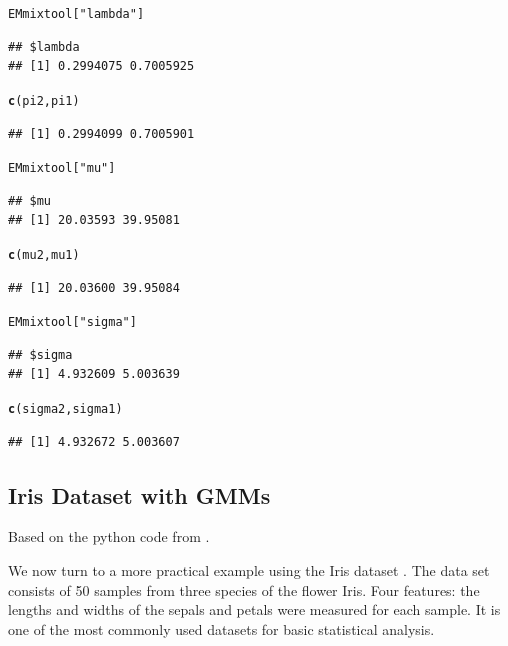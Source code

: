 \documentclass{article}\usepackage[]{graphicx}\usepackage[]{xcolor}
\makeatletter
\newcommand{\hlstr}[1]{\textcolor[rgb]{0.192,0.494,0.8}{#1}}%
\newcommand{\hlstd}[1]{\textcolor[rgb]{0.345,0.345,0.345}{#1}}%
\newcommand{\hlkwd}[1]{\textcolor[rgb]{0.737,0.353,0.396}{\textbf{#1}}}%
\newenvironment{kframe}{%
 \def\at@end@of@kframe{}%
 \ifinner\ifhmode%
  \def\at@end@of@kframe{\end{minipage}}%
  \begin{minipage}{\columnwidth}%
 \fi\fi%
 \def\FrameCommand##1{\hskip\@totalleftmargin \hskip-\fboxsep
 \colorbox{shadecolor}{##1}\hskip-\fboxsep
     \hskip-\linewidth \hskip-\@totalleftmargin \hskip\columnwidth}%
 \MakeFramed {\advance\hsize-\width
   \@totalleftmargin\z@ \linewidth\hsize
   \@setminipage}}%
 {\par\unskip\endMakeFramed%
 \at@end@of@kframe}
\newenvironment{knitrout}{}{} %
\theoremstyle{plain}
\theoremstyle{definition}
\theoremstyle{remark}
\makeatother
\begin{document}
\begin{knitrout}
\color{fgcolor}\begin{kframe}
\begin{alltt}
  \hlstd{EMmixtool[}\hlstr{"lambda"}\hlstd{]}
\end{alltt}
\begin{verbatim}
## $lambda
## [1] 0.2994075 0.7005925
\end{verbatim}
\begin{alltt}
  \hlkwd{c}\hlstd{(pi2, pi1)}
\end{alltt}
\begin{verbatim}
## [1] 0.2994099 0.7005901
\end{verbatim}
\begin{alltt}
  \hlstd{EMmixtool[}\hlstr{"mu"}\hlstd{]}
\end{alltt}
\begin{verbatim}
## $mu
## [1] 20.03593 39.95081
\end{verbatim}
\begin{alltt}
  \hlkwd{c}\hlstd{(mu2, mu1)}
\end{alltt}
\begin{verbatim}
## [1] 20.03600 39.95084
\end{verbatim}
\begin{alltt}
  \hlstd{EMmixtool[}\hlstr{"sigma"}\hlstd{]}
\end{alltt}
\begin{verbatim}
## $sigma
## [1] 4.932609 5.003639
\end{verbatim}
\begin{alltt}
  \hlkwd{c}\hlstd{(sigma2, sigma1)}
\end{alltt}
\begin{verbatim}
## [1] 4.932672 5.003607
\end{verbatim}
\end{kframe}
\end{knitrout}

\subsection{Iris Dataset with GMMs}
Based on the python code from \cite{Iris_Implementation}.

We now turn to a more practical example using the Iris dataset \cite{Dua:2019}. The data set consists of 50 samples from three species of the flower Iris. Four features: the lengths and widths of the sepals and petals were measured for each sample. It is one of the most commonly used datasets for basic statistical analysis.
\end{document}
